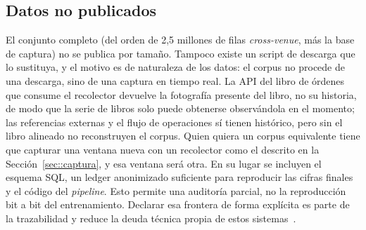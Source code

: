 \subsection{Datos no publicados}

El conjunto completo (del orden de 2,5 millones de filas \emph{cross-venue}, más la base de
captura) no se publica por tamaño. Tampoco existe un script de descarga que lo sustituya, y
el motivo es de naturaleza de los datos: el corpus no procede de una descarga, sino de una
captura en tiempo real. La API del libro de órdenes que consume el recolector devuelve la
fotografía presente del libro, no su historia, de modo que la serie de libros solo puede
obtenerse observándola en el momento; las referencias externas y el flujo de operaciones sí
tienen histórico, pero sin el libro alineado no reconstruyen el corpus. Quien quiera un
corpus equivalente tiene que capturar una ventana nueva con un recolector como el descrito
en la Sección~\ref{sec::captura}, y esa ventana será otra. En su lugar se incluyen el esquema SQL, un ledger anonimizado suficiente
para reproducir las cifras finales y el código del \emph{pipeline}. Esto permite una
auditoría parcial, no la reproducción bit a bit del entrenamiento. Declarar
esa frontera de forma explícita es parte de la trazabilidad y reduce la deuda técnica propia de
estos sistemas~\cite{sculley2015debt}.
